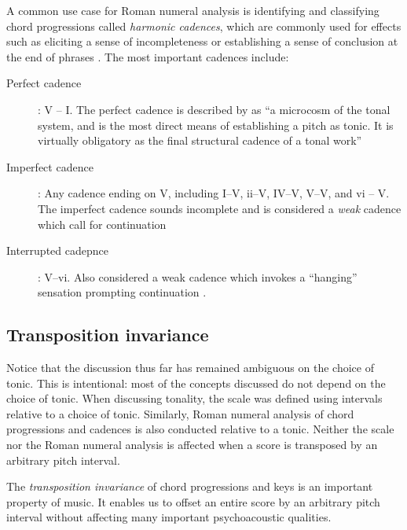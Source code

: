 A common use case for Roman numeral analysis is identifying and classifying
chord progressions called \emph{harmonic cadences}, which are commonly used for
effects such as eliciting a sense of incompleteness
\citep{jonas1982introduction} or establishing a sense of conclusion at the end
of phrases \citep{randel1999harvard}. The most important cadences include:
\begin{description}
  \item[Perfect cadence]: \RN{5} -- \RN{1}. The perfect cadence is described by
    \citet{randel1999harvard} as ``a microcosm of the tonal system, and is the
    most direct means of establishing a pitch as tonic. It is virtually
    obligatory as the final structural cadence of a tonal work''
  \item[Imperfect cadence]: Any cadence ending on \RN{5}, including
    \RN{1}--\RN{5}, \Rn{2}--\RN{5}, \RN{4}--\RN{5}, \RN{5}--\RN{5}, and \Rn{6}
    -- \RN{5}. The imperfect cadence sounds incomplete and is considered
    a \emph{weak} cadence which call for continuation \citep{jonas1982introduction}
  \item[Interrupted cadepnce]: \RN{5}--\Rn{6}. Also considered a weak cadence
    which invokes a ``hanging'' sensation prompting continuation
    \citep{piston1978harmony}.
\end{description}

\subsection{Transposition invariance}\label{sec:transposition-invariance}

Notice that the discussion thus far has remained ambiguous on the choice of
tonic. This is intentional: most of the concepts discussed do not depend on the
choice of tonic. When discussing tonality, the scale was defined using
intervals relative to a choice of tonic. Similarly, Roman numeral analysis of
chord progressions and cadences is also conducted relative to a tonic. Neither
the scale nor the Roman numeral analysis is affected when a score is transposed
by an arbitrary pitch interval.

The \emph{transposition invariance} of chord progressions and keys is an
important property of music. It enables us to offset an entire score by an
arbitrary pitch interval without affecting many important psychoacoustic
qualities.
